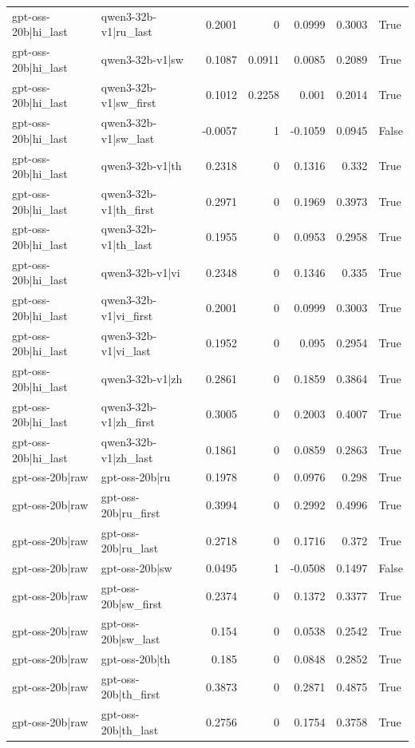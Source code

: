 \begin{table}
\begin{tabular}{l l r r r r l}
gpt-oss-20b|hi_last & qwen3-32b-v1|ru_last & 0.2001 & 0 & 0.0999 & 0.3003 & True \\
gpt-oss-20b|hi_last & qwen3-32b-v1|sw & 0.1087 & 0.0911 & 0.0085 & 0.2089 & True \\
gpt-oss-20b|hi_last & qwen3-32b-v1|sw_first & 0.1012 & 0.2258 & 0.001 & 0.2014 & True \\
gpt-oss-20b|hi_last & qwen3-32b-v1|sw_last & -0.0057 & 1 & -0.1059 & 0.0945 & False \\
gpt-oss-20b|hi_last & qwen3-32b-v1|th & 0.2318 & 0 & 0.1316 & 0.332 & True \\
gpt-oss-20b|hi_last & qwen3-32b-v1|th_first & 0.2971 & 0 & 0.1969 & 0.3973 & True \\
gpt-oss-20b|hi_last & qwen3-32b-v1|th_last & 0.1955 & 0 & 0.0953 & 0.2958 & True \\
gpt-oss-20b|hi_last & qwen3-32b-v1|vi & 0.2348 & 0 & 0.1346 & 0.335 & True \\
gpt-oss-20b|hi_last & qwen3-32b-v1|vi_first & 0.2001 & 0 & 0.0999 & 0.3003 & True \\
gpt-oss-20b|hi_last & qwen3-32b-v1|vi_last & 0.1952 & 0 & 0.095 & 0.2954 & True \\
gpt-oss-20b|hi_last & qwen3-32b-v1|zh & 0.2861 & 0 & 0.1859 & 0.3864 & True \\
gpt-oss-20b|hi_last & qwen3-32b-v1|zh_first & 0.3005 & 0 & 0.2003 & 0.4007 & True \\
gpt-oss-20b|hi_last & qwen3-32b-v1|zh_last & 0.1861 & 0 & 0.0859 & 0.2863 & True \\
gpt-oss-20b|raw & gpt-oss-20b|ru & 0.1978 & 0 & 0.0976 & 0.298 & True \\
gpt-oss-20b|raw & gpt-oss-20b|ru_first & 0.3994 & 0 & 0.2992 & 0.4996 & True \\
gpt-oss-20b|raw & gpt-oss-20b|ru_last & 0.2718 & 0 & 0.1716 & 0.372 & True \\
gpt-oss-20b|raw & gpt-oss-20b|sw & 0.0495 & 1 & -0.0508 & 0.1497 & False \\
gpt-oss-20b|raw & gpt-oss-20b|sw_first & 0.2374 & 0 & 0.1372 & 0.3377 & True \\
gpt-oss-20b|raw & gpt-oss-20b|sw_last & 0.154 & 0 & 0.0538 & 0.2542 & True \\
gpt-oss-20b|raw & gpt-oss-20b|th & 0.185 & 0 & 0.0848 & 0.2852 & True \\
gpt-oss-20b|raw & gpt-oss-20b|th_first & 0.3873 & 0 & 0.2871 & 0.4875 & True \\
gpt-oss-20b|raw & gpt-oss-20b|th_last & 0.2756 & 0 & 0.1754 & 0.3758 & True \\

\end{tabular}
\end{table}
